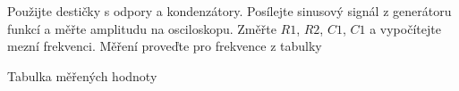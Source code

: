 \documentclass[12pt,a4paper]{article}
\begin{document}
Použijte destičky s odpory a kondenzátory. Posílejte sinusový signál z generátoru funkcí a měřte amplitudu na osciloskopu. Změřte $R1$, $R2$, $C1$, $C1$ a vypočítejte mezní frekvenci. Měření proveďte pro frekvence z tabulky
\begin{table}[h!]
	\begin{center}\def\arraystretch{1}
		\caption{Tabulka měřených hodnoty}
		\label{table1}
	\end{center}
\end{table}
\end{document}
